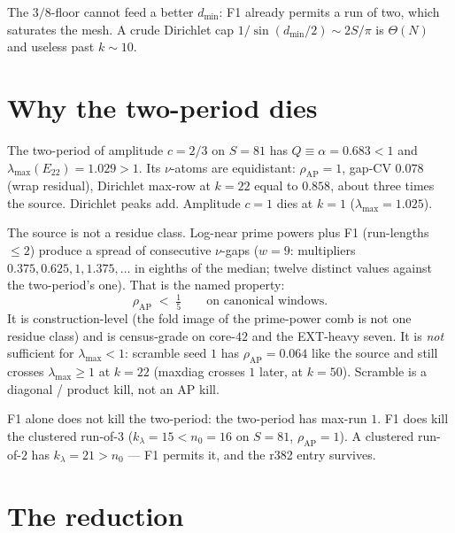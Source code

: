 \documentclass[11pt]{article}
\theoremstyle{remark}
\begin{document}
The $3/8$-floor cannot feed a better $d_{\min}$: F1 already
permits a run of two, which saturates the mesh.  A crude
Dirichlet cap $1/\sin(d_{\min}/2)\sim 2S/\pi$ is $\Theta(N)$ and
useless past $k\sim 10$.

\section{Why the two-period dies}\label{sec:ap}

The two-period of amplitude $c=2/3$ on $S=81$ has
$Q\equiv\alpha=0.683<1$ and $\lambda_{\max}(E_{22})=1.029>1$.
Its $\nu$-atoms are equidistant: $\rho_{\mathrm{AP}}=1$,
gap-CV $0.078$ (wrap residual), Dirichlet max-row at $k=22$
equal to $0.858$, about three times the source.
Dirichlet peaks add.  Amplitude $c=1$ dies at $k=1$
($\lambda_{\max}=1.025$).

The source is not a residue class.  Log-near prime powers plus
F1 (run-lengths $\le 2$) produce a spread of consecutive
$\nu$-gaps ($w=9$: multipliers $0.375,0.625,1,1.375,\ldots$ in
eighths of the median; twelve distinct values against the
two-period's one).  That is the named property:
\begin{equation}\label{eq:rho}
\rho_{\mathrm{AP}}
\;<\;
\tfrac15
\qquad\text{on canonical windows.}
\end{equation}
It is construction-level (the fold image of the prime-power comb
is not one residue class) and is census-grade on core-$42$ and
the EXT-heavy seven.  It is \emph{not} sufficient for
$\lambda_{\max}<1$: scramble seed $1$ has $\rho_{\mathrm{AP}}=0.064$
like the source and still crosses $\lambda_{\max}\ge 1$ at $k=22$
(maxdiag crosses $1$ later, at $k=50$).  Scramble is a diagonal /
product kill, not an AP kill.

F1 alone does not kill the two-period: the two-period has
max-run $1$.  F1 does kill the clustered run-of-$3$
($k_{\lambda}=15<n_0=16$ on $S=81$, $\rho_{\mathrm{AP}}=1$).
A clustered run-of-$2$ has $k_{\lambda}=21>n_0$ --- F1 permits it,
and the r382 entry survives.

\section{The reduction}\label{sec:red}
\end{document}
